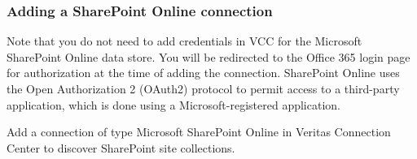 \documentclass[letterpaper,10pt,english]{sphinxmanual}
\begin{document}
\subsubsection{Adding a SharePoint Online connection}
\label{\detokenize{mcdmp_app_ug:adding-a-sharepoint-online-connection}}
Note that you do not need to add credentials in VCC for the Microsoft SharePoint Online data store. You will be redirected to the Office 365 login page for authorization at the time of adding the connection. SharePoint Online uses the Open Authorization 2 (OAuth2) protocol to permit access to a third-party application, which is done
using a Microsoft-registered application.

Add a connection of type Microsoft SharePoint Online in Veritas Connection Center to discover SharePoint site collections.
\end{document}
